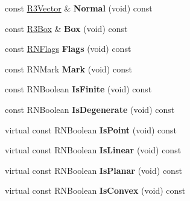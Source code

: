\begin{DoxyCompactItemize}
\item 
const \hyperlink{class_r3_vector}{R3\+Vector} \& {\bfseries Normal} (void) const \hypertarget{class_r3_triangle_ad44cd8ce46c998a0f75e4349216872c9}{}\label{class_r3_triangle_ad44cd8ce46c998a0f75e4349216872c9}

\item 
const \hyperlink{class_r3_box}{R3\+Box} \& {\bfseries Box} (void) const \hypertarget{class_r3_triangle_add5e129187af577fcd7f42da27965740}{}\label{class_r3_triangle_add5e129187af577fcd7f42da27965740}

\item 
const \hyperlink{class_r_n_flags}{R\+N\+Flags} {\bfseries Flags} (void) const \hypertarget{class_r3_triangle_a1d6a8e72b57bfcb9fa3da6434d107830}{}\label{class_r3_triangle_a1d6a8e72b57bfcb9fa3da6434d107830}

\item 
const R\+N\+Mark {\bfseries Mark} (void) const \hypertarget{class_r3_triangle_aafe16d22d7f111b623ae2e9dad44bbd4}{}\label{class_r3_triangle_aafe16d22d7f111b623ae2e9dad44bbd4}

\item 
const R\+N\+Boolean {\bfseries Is\+Finite} (void) const \hypertarget{class_r3_triangle_a0858d44a26049e898d71bcc046795415}{}\label{class_r3_triangle_a0858d44a26049e898d71bcc046795415}

\item 
const R\+N\+Boolean {\bfseries Is\+Degenerate} (void) const \hypertarget{class_r3_triangle_a4d185bfbdaec8318215fc54e7703a741}{}\label{class_r3_triangle_a4d185bfbdaec8318215fc54e7703a741}

\item 
virtual const R\+N\+Boolean {\bfseries Is\+Point} (void) const \hypertarget{class_r3_triangle_af0769d0efe11a08ff66a69d9fce02f6b}{}\label{class_r3_triangle_af0769d0efe11a08ff66a69d9fce02f6b}

\item 
virtual const R\+N\+Boolean {\bfseries Is\+Linear} (void) const \hypertarget{class_r3_triangle_a4c305ede4425a7005d2b7c08aa2dda79}{}\label{class_r3_triangle_a4c305ede4425a7005d2b7c08aa2dda79}

\item 
virtual const R\+N\+Boolean {\bfseries Is\+Planar} (void) const \hypertarget{class_r3_triangle_a3b163f1d3273a4fbeab7c7d42fb2ad8d}{}\label{class_r3_triangle_a3b163f1d3273a4fbeab7c7d42fb2ad8d}

\item 
virtual const R\+N\+Boolean {\bfseries Is\+Convex} (void) const \hypertarget{class_r3_triangle_ab87ced483dbcd6eccb734e42467c1fc3}{}\label{class_r3_triangle_ab87ced483dbcd6eccb734e42467c1fc3}


\end{DoxyCompactItemize}
